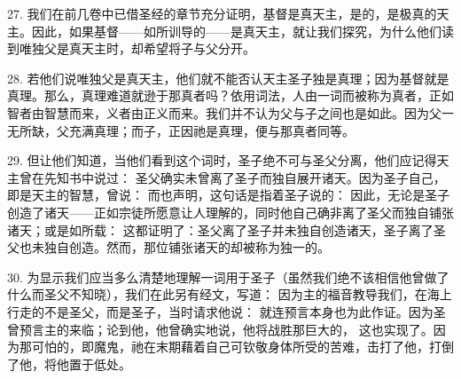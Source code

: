 \par

27. 我们在前几卷中已借圣经的章节充分证明，基督是真天主，是的，是极真的天主。因此，如果基督——如所训导的——是真天主，就让我们探究，为什么他们读到唯独父是真天主时，却希望将子与父分开。\par

28. 若他们说唯独父是真天主，他们就不能否认天主圣子独是真理；因为基督就是真理。那么，真理难道就逊于那真者吗？依用词法，人由一词而被称为真者，正如智者由智慧而来，义者由正义而来。我们并不认为父与子之间也是如此。因为父一无所缺，父充满真理；而子，正因祂是真理，便与那真者同等。\par

29. 但让他们知道，当他们看到这个词时，圣子绝不可与圣父分离，他们应记得天主曾在先知书中说过： 圣父确实未曾离了圣子而独自展开诸天。因为圣子自己，即是天主的智慧，曾说： 而也声明，这句话是指着圣子说的： 因此，无论是圣子创造了诸天——正如宗徒所愿意让人理解的，同时他自己确非离了圣父而独自铺张诸天；或是如所载： 这都证明了：圣父离了圣子并未独自创造诸天，圣子离了圣父也未独自创造。然而，那位铺张诸天的却被称为独一的。\par

30. 为显示我们应当多么清楚地理解一词用于圣子（虽然我们绝不该相信他曾做了什么而圣父不知晓），我们在此另有经文，写道： 因为主的福音教导我们，在海上行走的不是圣父，而是圣子，当时请求他说： 就连预言本身也为此作证。因为圣曾预言主的来临；论到他，他曾确实地说，他将战胜那巨大的， 这也实现了。因为那可怕的，即魔鬼，祂在末期藉着自己可钦敬身体所受的苦难，击打了他，打倒了他，将他置于低处。\par

